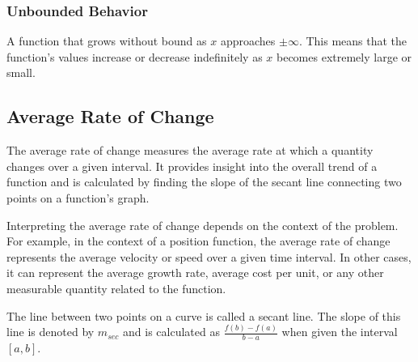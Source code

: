 \documentclass{article}
\begin{document}
\begin{center}
\end{center}

\subsubsection*{Unbounded Behavior}
A function that grows without bound as $x$ approaches $\pm\infty$. This means that the function's values increase or decrease indefinitely as $x$ becomes extremely large or small.

\begin{center}
\end{center}

\subsection{Average Rate of Change}

The average rate of change measures the average rate at which a quantity changes over a given interval. It provides insight into the overall trend of a function and is calculated by finding the slope of the secant line connecting two points on a function's graph.

Interpreting the average rate of change depends on the context of the problem. For example, in the context of a position function, the average rate of change represents the average velocity or speed over a given time interval. In other cases, it can represent the average growth rate, average cost per unit, or any other measurable quantity related to the function.

The line between two points on a curve is called a secant line. The slope of this line is denoted by $m_{sec}$ and is calculated as $\frac{f(b) - f(a)}{b-a}$ when given the interval $[a,b]$.
\end{document}
